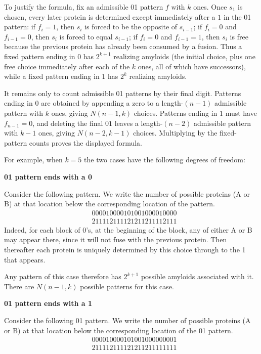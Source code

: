 \documentclass[11pt]{article}
\begin{document}
To justify the formula, fix an admissible 01 pattern $f$ with $k$ ones. Once $s_1$ is chosen, every later protein is determined except immediately after a $1$ in the 01 pattern: if $f_i=1$, then $s_i$ is forced to be the opposite of $s_{i-1}$; if $f_i=0$ and $f_{i-1}=0$, then $s_i$ is forced to equal $s_{i-1}$; if $f_i=0$ and $f_{i-1}=1$, then $s_i$ is free because the previous protein has already been consumed by a fusion. Thus a fixed pattern ending in $0$ has $2^{k+1}$ realizing amyloids (the initial choice, plus one free choice immediately after each of the $k$ ones, all of which have successors), while a fixed pattern ending in $1$ has $2^k$ realizing amyloids.

It remains only to count admissible 01 patterns by their final digit. Patterns ending in $0$ are obtained by appending a zero to a length-$(n-1)$ admissible pattern with $k$ ones, giving $N(n-1,k)$ choices. Patterns ending in $1$ must have $f_{n-1}=0$, and deleting the final $01$ leaves a length-$(n-2)$ admissible pattern with $k-1$ ones, giving $N(n-2,k-1)$ choices. Multiplying by the fixed-pattern counts proves the displayed formula.

For example, when $k = 5$ the two cases have the following degrees of freedom:

\textbf{01 pattern ends with a 0}

Consider the following pattern. We write the number of possible proteins (A or B) at that location below the corresponding location of the pattern.
\begin{align*} 
    & 000010000101001000010000 \\
    & 211112111121211211112111
\end{align*}
Indeed, for each block of 0's, at the beginning of the block, any of either A or B may appear there, since it will not fuse with the previous protein. Then thereafter each protein is uniquely determined by this choice through to the 1 that appears.

Any pattern of this case therefore has $2^{k+1}$ possible amyloids associated with it. There are $N(n-1,k)$ possible patterns for this case. 

\textbf{01 pattern ends with a 1}

Consider the following 01 pattern. We write the number of possible proteins (A or B) at that location below the corresponding location of the 01 pattern.
\begin{align*} 
    & 000010000101001000000001 \\
    & 211112111121211211111111
\end{align*}
\end{document}
